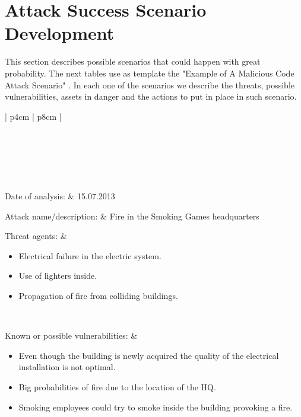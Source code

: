 \section{Attack Success Scenario Development}\label{sec:Successful_Attack}
This section describes possible scenarios that could happen with great probability. The next tables use as template the "Example of A Malicious Code Attack Scenario" \cite{whitman4}. In each one of the scenarios we describe the threats, possible vulnerabilities, assets in danger and the actions to put in place in such scenario.

\begin{longtable}{| p{4cm} | p{8cm} |}

	\hline {}\\\hline
	\endfirsthead
	
	\hline {}\\\hline
	\endhead
	
	\\\hline
	\endfoot
	
	\endlastfoot
	
	Date of analysis: & 15.07.2013 \\\hline
	
	Attack name/description: &  Fire in the Smoking Games headquarters\\\hline
	
	Threat agents: & 
	\begin{itemize}
	\item Electrical failure in the electric system.
	\item Use of lighters inside.
	\item Propagation of fire from colliding buildings.
	\end{itemize}\\\hline
	
	Known or possible vulnerabilities: &
	\begin{itemize}
	\item Even though the building is newly acquired the quality of the electrical installation is not optimal.
	\item Big probabilities of fire due to the location of the HQ.
	\item Smoking employees could try to smoke inside the building provoking a fire.
	\end{itemize}\\\hline
	

\end{longtable}
